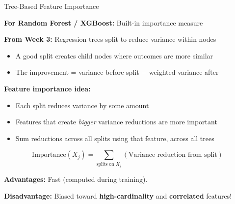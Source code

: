 \documentclass[10pt]{beamer}
\newcommand{\highlight}[1]{\textcolor{AccentOrange}{\textbf{#1}}}
\begin{document}
\begin{frame}{Tree-Based Feature Importance}

  \textbf{For Random Forest / XGBoost:} Built-in importance measure

  \vspace{0.5em}
  \textbf{From Week 3:} Regression trees split to reduce variance within nodes
  \begin{itemize}
    \item A good split creates child nodes where outcomes are more similar
    \item The improvement = variance before split $-$ weighted variance after
  \end{itemize}

  \vspace{0.5em}
  \textbf{Feature importance idea:}
  \begin{itemize}
    \item Each split reduces variance by some amount
    \item Features that create \emph{bigger} variance reductions are more important
    \item Sum reductions across all splits using that feature, across all trees
  \end{itemize}

  \vspace{0.3em}
  \[
  \text{Importance}(X_j) = \sum_{\text{splits on } X_j} (\text{Variance reduction from split})
 \]

  \vspace{0.3em}
  \textbf{Advantages:} Fast (computed during training).

  \vspace{0.3em}
  \textbf{Disadvantage:} Biased toward \highlight{high-cardinality} and \highlight{correlated} features!
\end{frame}

\end{document}
